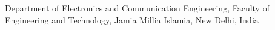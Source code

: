 \begin{affiliations}
  \item Department of Electronics and Communication Engineering, Faculty of
  Engineering and Technology, Jamia Millia Islamia, New Delhi, India
\end{affiliations}